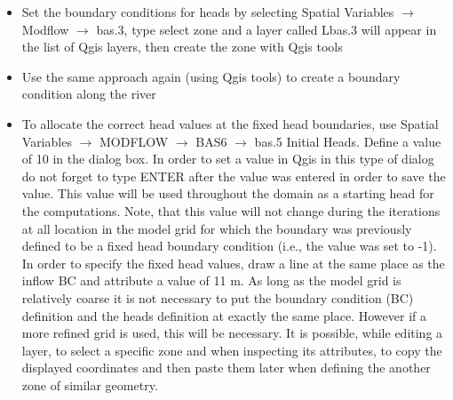 \begin{itemize}
\item Set the boundary conditions for heads by 
selecting {\color{blue}Spatial Variables} $\rightarrow$ {\color{blue}Modflow} $\rightarrow$ 
{\color{blue}bas.3}, type select zone and a layer called Lbas.3 will appear in the list of Qgis layers, 
then create the zone with Qgis tools



\item Use the same approach again (using Qgis tools) to create a boundary condition along the river

\item To allocate the correct head values at the fixed head boundaries, 
use {\color{blue}Spatial Variables} $\rightarrow$ {\color{blue}MODFLOW} $\rightarrow$ 
{\color{blue}BAS6}
$\rightarrow$ {\color{blue}bas.5 Initial Heads}. 
Define a value of 10 in the dialog box.
In order to set a value in Qgis in this type of dialog do not forget to type 
ENTER after the value was entered in order to save the value.
This value will be used throughout the domain as a starting head for the computations.
Note, that this value will not change during the iterations at all location in the model grid for which 
the boundary was previously defined to be a fixed head boundary condition (i.e., the value was set to -1).
In order to specify the fixed head values, draw a line at the same place as the inflow BC 
and attribute a value of 11 m. As long as the model grid is relatively 
coarse it is not necessary to put the boundary condition (BC) definition
and the heads definition at exactly the same place. 
However if a more refined grid is used, this will be necessary. 
It is possible, while editing a layer, to select a specific zone and when inspecting its attributes, 
to copy the displayed coordinates and then paste them later when defining the another zone of similar geometry.



\end{itemize}
